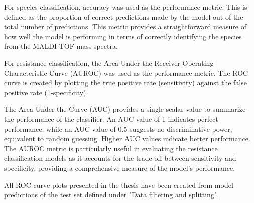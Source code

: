 \documentclass[english,11pt,a4paper,titlepage]{article}
\begin{document}
	For species classification, accuracy was used as the performance metric. This is defined as the proportion of correct predictions made by the model out of the total number of predictions. This metric provides a straightforward measure of how well the model is performing in terms of correctly identifying the species from the MALDI-TOF mass spectra.
	
	For resistance classification, the Area Under the Receiver Operating Characteristic Curve (AUROC) was used as the performance metric. The ROC curve is created by plotting the true positive rate (sensitivity) against the false positive rate (1-specificity). 
	
	The Area Under the Curve (AUC) provides a single scalar value to summarize the performance of the classifier. An AUC value of 1 indicates perfect performance, while an AUC value of 0.5 suggests no discriminative power, equivalent to random guessing. Higher AUC values indicate better performance. The AUROC metric is particularly useful in evaluating the resistance classification models as it accounts for the trade-off between sensitivity and specificity, providing a comprehensive measure of the model's performance.
	
	All ROC curve plots presented in the thesis have been created from model predictions of the test set defined under "Data filtering and splitting".
	
\end{document}
